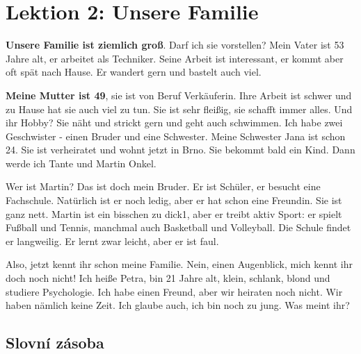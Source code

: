 \setchaptertoc
\chapter{Lektion 2: Unsere Familie}\label{NJ:chap_N1_L2}

    \textbf{Unsere Familie ist ziemlich groß}. Darf ich sie vorstellen? Mein Vater ist 53 
    Jahre 
    alt, er arbeitet als Techniker. Seine Arbeit ist interessant, er kommt aber oft spät nach 
    Hause. Er wandert gern und bastelt auch viel.
    
    \textbf{Meine Mutter ist 49}, sie ist von Beruf Verkäuferin. Ihre Arbeit ist schwer und zu 
    Hause hat sie auch viel zu tun. Sie ist sehr fleißig, sie schafft immer alles. Und ihr Hobby? 
    Sie näht und strickt gern und geht auch schwimmen. Ich habe zwei Geschwister - einen Bruder und 
    eine Schwester. Meine Schwester Jana ist schon 24.  Sie ist verheiratet und wohnt jetzt in 
    Brno. Sie bekommt bald ein Kind. Dann werde ich Tante und Martin Onkel.
    
    Wer ist Martin? Das ist doch mein Bruder. Er ist Schüler, er besucht eine Fachschule.   
    Natürlich ist er noch ledig, aber er hat schon eine Freundin. Sie ist ganz nett. Martin ist ein 
    bisschen zu dick1, aber er treibt aktiv Sport: er spielt Fußball und Tennis, manchmal auch 
    Basketball und Volleyball. Die Schule findet er langweilig. Er lernt zwar leicht, aber er ist 
    faul.
    
    Also, jetzt kennt ihr schon meine Familie. Nein, einen Augenblick, mich kennt ihr doch noch 
    nicht! Ich heiße Petra, bin 21 Jahre alt, klein, schlank, blond und studiere Psychologie.    
    Ich habe einen Freund, aber wir heiraten noch nicht. Wir haben nämlich keine Zeit. Ich glaube 
    auch, ich bin noch zu jung. Was meint ihr?

  \section*{Slovní zásoba}

